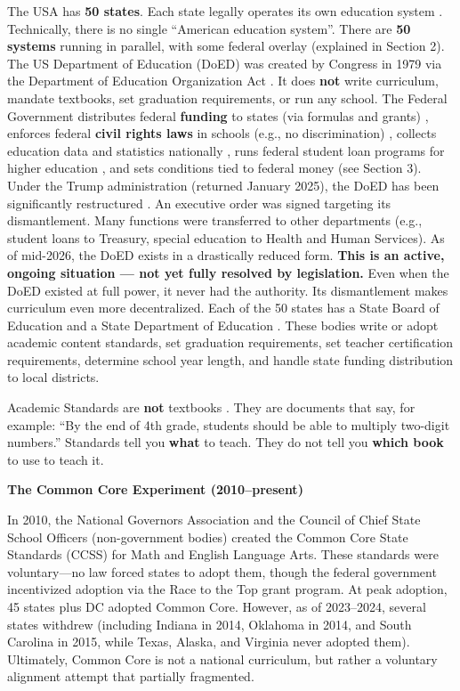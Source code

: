 The USA has \textbf{50 states}. Each state legally operates its own education system \cite{us-ed-gov-k12}. Technically, there is no single ``American education system''. There are \textbf{50 systems} running in parallel, with some federal overlay (explained in Section 2). The US Department of Education (DoED) was created by Congress in 1979 via the Department of Education Organization Act \cite{us-doed-act}. It does \textbf{not} write curriculum, mandate textbooks, set graduation requirements, or run any school. The Federal Government distributes federal \textbf{funding} to states (via formulas and grants) \cite{us-ed-gov-k12}, enforces federal \textbf{civil rights laws} in schools (e.g., no discrimination) \cite{us-doed-act}, collects education data and statistics nationally \cite{nces-digest}, runs federal student loan programs for higher education \cite{nces-ipeds}, and sets conditions tied to federal money (see Section 3). Under the Trump administration (returned January 2025), the DoED has been significantly restructured \cite{us-doed-2026}. An executive order was signed targeting its dismantlement. Many functions were transferred to other departments (e.g., student loans to Treasury, special education to Health and Human Services). As of mid-2026, the DoED exists in a drastically reduced form. \textbf{This is an active, ongoing situation --- not yet fully resolved by legislation.} Even when the DoED existed at full power, it never had the authority. Its dismantlement makes curriculum even more decentralized. Each of the 50 states has a State Board of Education and a State Department of Education \cite{ref18}. These bodies write or adopt academic content standards, set graduation requirements, set teacher certification requirements, determine school year length, and handle state funding distribution to local districts.

\vspace{0.3cm}

Academic Standards are \textbf{not} textbooks \cite{us-ed-gov-k12}. They are documents that say, for example: ``By the end of 4th grade, students should be able to multiply two-digit numbers.'' Standards tell you \textbf{what} to teach. They do not tell you \textbf{which book} to use to teach it.

\vspace{0.3cm}
{\large\textbf{The Common Core Experiment (2010--present)}}

In 2010, the National Governors Association and the Council of Chief State School Officers (non-government bodies) created the Common Core State Standards (CCSS) for Math and English Language Arts. These standards were voluntary—no law forced states to adopt them, though the federal government incentivized adoption via the Race to the Top grant program. At peak adoption, 45 states plus DC adopted Common Core. However, as of 2023–2024, several states withdrew (including Indiana in 2014, Oklahoma in 2014, and South Carolina in 2015, while Texas, Alaska, and Virginia never adopted them). Ultimately, Common Core is not a national curriculum, but rather a voluntary alignment attempt that partially fragmented.

